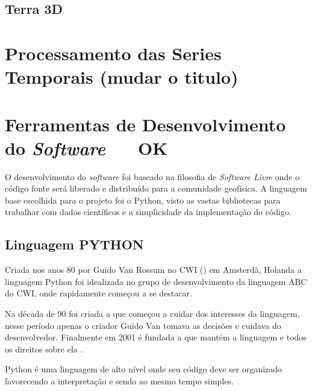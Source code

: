         
        \subsection{Terra 3D}
    
    \section{Processamento das Series Temporais (mudar o titulo)}
    
    
    
    
    
    \section{Ferramentas de Desenvolvimento do \textit{Software} \,\,\,\,\,\,\, OK}
    
        O desenvolvimento do \textit{software} foi baseado na filosofia de \textit{Software Livre} \cite{soft_free} onde o código fonte será liberado e distribuído para a comunidade geofísica. A linguagem base escolhida para o projeto foi o Python, visto as vastas bibliotecas para trabalhar com dados científicos e a simplicidade da implementação do código.  
        
        \subsection{Linguagem PYTHON}
            \label{lim_python}
            
            Criada nos anos 80 por Guido Van Rossum no CWI () em Amsterdã, Holanda a linguagem Python foi idealizada no grupo de desenvolvimento da linguagem ABC do CWI, onde rapidamente começou a se destacar.
            
            Na década de 90 foi criada a  que começou a cuidar dos interesses da linguagem, nesse período apenas o criador Guido Van tomava as decisões e cuidava do desenvolvedor. Finalmente em 2001 é fundada a  que mantém a linguagem e todos os direitos sobre ela \cite{python36}.  
            
            Python é uma linguagem de alto nível onde seu código deve ser organizado favorecendo a interpretação e sendo ao mesmo tempo simples.
            
